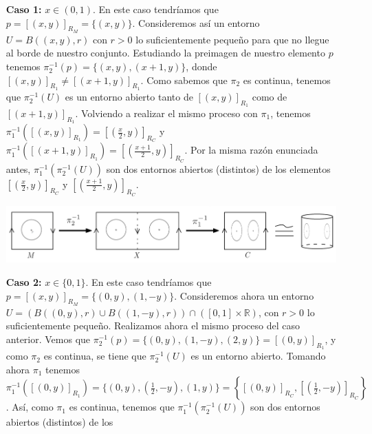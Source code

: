 \documentclass[fleqn]{article}
\def\R{\mathds{R}}
\begin{document}
    \begin{enumerate}
        \item[\textbf{Caso 1: }] $x \in (0,1)$. En este caso tendríamos que $p = [(x,y)]_{R_M} = \{(x,y)\}$. Consideremos así un entorno $U = B((x,y), r)$ con $r>0$ lo
                            suficientemente pequeño para que no llegue al borde de nuestro conjunto. Estudiando la preimagen de nuestro elemento $p$ tenemos
                            $\pi_2 ^{-1} (p) = \{(x,y), (x+1, y)\}$, donde $ [(x,y)]_{R_1} \neq [(x+1,y)]_{R_1}$. Como sabemos que $\pi_2$ es continua, tenemos que 
                            $\pi_2 ^{-1} (U)$ es un entorno abierto tanto de $ [(x,y)]_{R_1} $ como de $ [(x+1,y)]_{R_1}$. 
                            Volviendo a realizar el mismo proceso con $\pi_1$, tenemos $\pi_1 ^{-1} \left( [(x,y)]_{R_1} \right) = [(\frac{x}{2},y)]_{R_C}$
                            y $\pi_1 ^{-1} \left( [(x+1,y)]_{R_1} \right) = [(\frac{x+1}{2},y)]_{R_C}$. Por la misma razón enunciada antes, 
                            $\pi_1^{-1}\left( \pi_2^{-1} (U)\right)$ son dos entornos abiertos (distintos) de los elementos $[(\frac{x}{2},y)]_{R_C}$ y
                            $[(\frac{x+1}{2},y)]_{R_C}$. 
                            \begin{center}
                                \noindent
                                \includegraphics[width=1\linewidth]{caso1.png}
                            \end{center}
        \item[\textbf{Caso 2: }] $x \in \{0,1\}$. En este caso tendríamos que $p = [(x,y)]_{R_M} = \{(0,y),(1,-y)\}$. Consideremos ahora un entorno 
                            $U = \left( B((0,y), r) \cup B((1,-y), r)\right) \cap ([0,1] \times \R)$, con $r>0$ lo suficientemente pequeño. Realizamos ahora 
                            el mismo proceso del caso anterior. Vemos que $\pi_2 ^{-1} (p) = \{(0,y), (1,-y), (2, y)\} = [(0,y)]_{R_1}$, y como $\pi_2$ es
                            continua, se tiene que $\pi_2 ^{-1} (U)$ es un entorno abierto.
                            Tomando ahora $\pi_1$ tenemos $\pi_1 ^{-1} \left( [(0,y)]_{R_1} \right) = \{(0,y), (\frac{1}{2}, -y), (1,y)\} = \left\{[(0,y)]_{R_C}, [(\frac{1}{2},-y)]_{R_C}\right\}$.
                            Así, como $\pi_1$ es continua, tenemos que $\pi_1^{-1}\left( \pi_2^{-1} (U)\right)$ son dos entornos abiertos (distintos) de los 

\end{enumerate}
\end{document}
